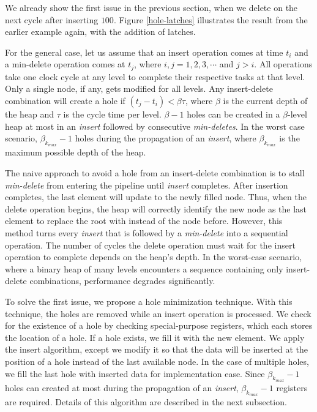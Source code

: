We already show the first issue in the previous section, when we delete on the next cycle after inserting $100$. 
Figure \ref{hole-latches} illustrates the result from the earlier example again, with the addition of latches.

For the general case, let us assume that an insert operation comes at time $t_i$ and a min-delete operation comes at $t_j$, where $i, j = 1,2,3, \cdots$ and $j>i$.
All operations take one clock cycle at any level to complete their respective tasks at that level.
Only a single node, if any, gets modified for all levels.
Any insert-delete combination will create a hole if $(t_j - t_i) < \beta\tau$, where $\beta$ is the current depth of the heap and $\tau$ is the cycle time per level. 
$\beta - 1$ holes can be created in a $\beta$-level heap at most in an {\it insert} followed by consecutive {\it min-deletes}. In the worst case scenario, $\beta_{k_{max}} - 1$ holes during the propagation of an {\it insert}, where $\beta_{k_{max}}$ is the maximum possible depth of the heap. 

The naive approach to avoid a hole from an insert-delete combination is to stall {\it min-delete} from entering the pipeline until {\it insert} completes.
After insertion completes, the last element will update to the newly filled node.
Thus, when the delete operation begins, the heap will correctly identify the new node as the last element to replace the root with instead of the node before.
However, this method turns every {\it insert} that is followed by a {\it min-delete} into a sequential operation.
The number of cycles the delete operation must wait for the insert operation to complete depends on the heap's depth.
In the worst-case scenario, where a binary heap of many levels encounters a sequence containing only insert-delete combinations, performance degrades significantly.

To solve the first issue, we propose a hole minimization technique.
With this technique, the holes are removed while an insert operation is processed.
We check for the existence of a hole by checking special-purpose registers, which each stores the location of a hole. 
If a hole exists, we fill it with the new element. 
We apply the insert algorithm, except we modify it so that the data will be inserted at the position of a hole instead of the last available node.
In the case of multiple holes, we fill the last hole with inserted data for implementation ease.
Since $\beta_{k_{max}} - 1$ holes can created at most during the propagation of an {\it insert}, $\beta_{k_{max}} - 1$ registers are required.
Details of this algorithm are described in the next subsection.

